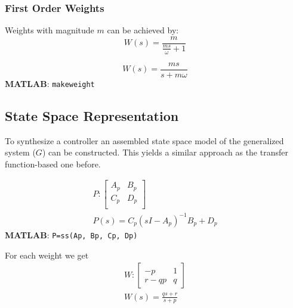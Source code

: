\subsubsection{First Order Weights}

Weights with magnitude $m$ can be achieved by:
\newpar{}
\begin{equation*}
    W(s) = \frac{m}{\frac{ms}{\omega}+1}
\end{equation*}

\begin{equation*}
    W(s) = \frac{ms}{s+m\omega}
\end{equation*}
\textbf{MATLAB}: \texttt{makeweight}

\subsection{State Space Representation}
To synthesize a controller an assembled state space model of the generalized system ($G$) can be constructed. This yields a similar approach as the transfer function-based one before.

\begin{gather*}
    P : \left[
        \begin{array}{c|c} %
            A_p & B_p \\
            \hline %
            C_p & D_p \\
        \end{array}
        \right]                            \\
    P(s) = {C_p(sI-A_p)}^{-1}B_p+D_p
\end{gather*}
\textbf{MATLAB}: \texttt{P=ss(Ap, Bp, Cp, Dp)}


For each weight we get
\begin{gather*}
    W : \left[
        \begin{array}{c|c} %
            -p   & 1 \\
            \hline %
            r-qp & q
        \end{array}
        \right]                   \\
    W(s) = \frac{qs+r}{s+p}
\end{gather*}


